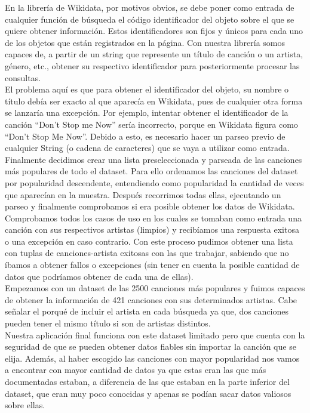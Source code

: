 En la librería de Wikidata, por motivos obvios, se debe poner como entrada de cualquier función de búsqueda el código identificador del objeto sobre el que se quiere obtener información. Estos identificadores son fijos y únicos para cada uno de los objetos que están registrados en la página. Con nuestra librería somos capaces de, a partir de un string que represente un título de canción o un artista, género, etc., obtener su respectivo identificador para posteriormente procesar las consultas.\\

El problema aquí es que para obtener el identificador del objeto, su nombre o título debía ser exacto al que aparecía en Wikidata, pues de cualquier otra forma se lanzaría una excepción. Por ejemplo, intentar obtener el identificador de la canción ``Don’t Stop me Now'' sería incorrecto, porque en Wikidata figura como ``Don’t Stop Me Now''. Debido a esto, es necesario hacer un parseo previo de cualquier String (o cadena de caracteres) que se vaya a utilizar como entrada.\\

Finalmente decidimos crear una lista preseleccionada y parseada de las canciones más populares de todo el dataset. Para ello ordenamos las canciones del dataset por popularidad descendente, entendiendo como popularidad la cantidad de veces que aparecían en la muestra. Después recorrimos todas ellas, ejecutando un parseo y finalmente comprobamos si era posible obtener los datos de Wikidata. Comprobamos todos los casos de uso en los cuales se tomaban como entrada una canción con sus respectivos artistas (limpios) y recibíamos una respuesta exitosa o una excepción en caso contrario. Con este proceso pudimos obtener una lista con tuplas de canciones-artista exitosas con las que trabajar, sabiendo que no íbamos a obtener fallos o excepciones (sin tener en cuenta la posible cantidad de datos que podríamos obtener de cada una de ellas).\\

Empezamos con un dataset de las 2500 canciones más populares y fuimos capaces de obtener la información de 421 canciones con sus determinados artistas. Cabe señalar el porqué de  incluir el artista en cada búsqueda ya que, dos canciones pueden tener el mismo título si son de artistas distintos.\\

Nuestra aplicación final funciona con este dataset limitado pero que cuenta con la seguridad de que se pueden obtener datos fiables sin importar la canción que se elija. Además, al haber escogido las canciones con mayor popularidad nos vamos a encontrar con mayor cantidad de datos ya que estas eran las que más documentadas estaban, a diferencia de las que estaban en la parte inferior del dataset, que eran muy poco conocidas y apenas se podían sacar datos valiosos sobre ellas.


